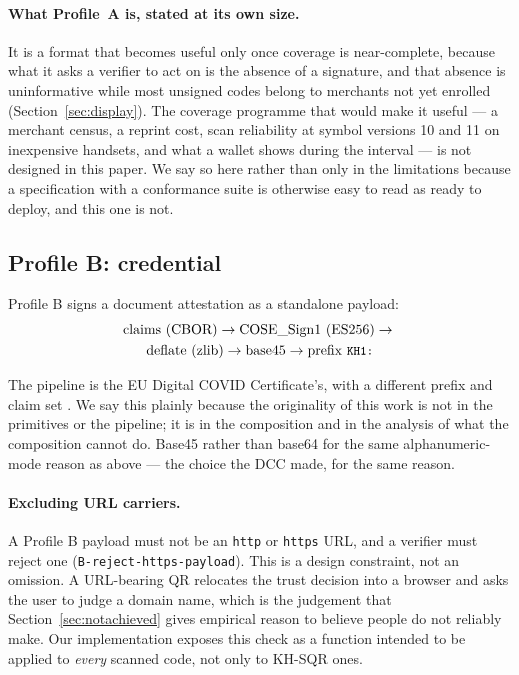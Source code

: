 \documentclass[10pt,a4paper,twocolumn]{article}
\newcommand{\code}[1]{\texttt{\small #1}}
\begin{document}
\paragraph{What Profile~A is, stated at its own size.} It is a format that
becomes useful only once coverage is near-complete, because what it asks a
verifier to act on is the absence of a signature, and that absence is
uninformative while most unsigned codes belong to merchants not yet enrolled
(Section~\ref{sec:display}). The coverage programme that would make it useful
--- a merchant census, a reprint cost, scan reliability at symbol versions 10
and 11 on inexpensive handsets, and what a wallet shows during the interval ---
is not designed in this paper. We say so here rather than only in the
limitations because a specification with a conformance suite is otherwise easy
to read as ready to deploy, and this one is not.

\subsection{Profile B: credential}
\label{sec:profileB}

Profile B signs a document attestation as a standalone payload:
\begin{gather*}
\text{claims (CBOR)} \rightarrow \text{COSE\_Sign1 (ES256)} \rightarrow{} \\
\text{deflate (zlib)} \rightarrow \text{base45} \rightarrow
\text{prefix \code{KH1:}}
\end{gather*}

The pipeline is the EU Digital COVID Certificate's, with a different prefix and
claim set \citep{eudcc2021,rfc9052,rfc9053,rfc8949,rfc1950,rfc1951,rfc9285}. We
say this plainly because the originality of this work is not in the primitives
or the pipeline; it is in the composition and in the analysis of what the
composition cannot do. Base45 rather than base64 for the same alphanumeric-mode
reason as above --- the choice the DCC made, for the same reason.

\paragraph{Excluding URL carriers.}
A Profile B payload must not be an \code{http} or \code{https} URL, and a
verifier must reject one (\code{B-reject-\allowbreak https-\allowbreak payload}).
This is a design constraint, not an omission. A
URL-bearing QR relocates the trust decision into a browser and asks the user to
judge a domain name, which is the judgement that Section~\ref{sec:notachieved}
gives empirical reason to believe people do not reliably make. Our
implementation exposes this check as a function intended to be applied to
\emph{every} scanned code, not only to KH-SQR ones.
\end{document}
